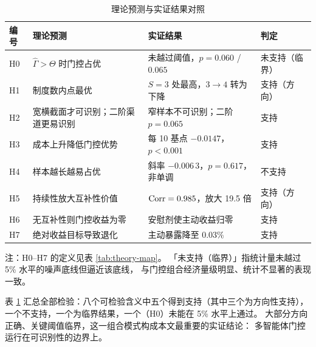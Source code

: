 \begin{table}[htbp]
\centering
\caption{理论预测与实证结果对照}
\label{tab:verdict}
\begin{threeparttable}
\footnotesize
\begin{tabular}{lp{4.2cm}p{4.6cm}l}
\toprule
编号 & 理论预测 & 实证结果 & 判定 \\
\midrule
H0 & $\hat\Gamma>\Theta$ 时门控占优 & 未越过阈值，$p=0.060$ / $0.065$ & 未支持（临界） \\
H1 & 制度数内点最优 & $S=3$ 处最高，$3\to4$ 转为下降 & 支持（方向） \\
H2 & 宽横截面才可识别；二阶渠道更易识别 & 窄样本不可识别；二阶 $p=0.065$ & 支持 \\
H3 & 成本上升降低门控优势 & 每 10 基点 $-0.0147$，$p<0.001$ & 支持 \\
H4 & 样本越长越易占优 & 斜率 $-0.006\,3$，$p=0.617$，非单调 & 不支持 \\
H5 & 持续性放大互补性价值 & $\mathrm{Corr}=0.985$，放大 19.5 倍 & 支持（方向） \\
H6 & 无互补性则门控收益为零 & 安慰剂使主动收益归零 & 支持 \\
H7 & 绝对收益目标导致退化 & 主动暴露降至 $0.03\%$ & 支持 \\
\bottomrule
\end{tabular}
\begin{tablenotes}[flushleft]\footnotesize
\item 注：H0--H7 的定义见表 \ref{tab:theory-map}。
「未支持（临界）」指统计量未越过 5\% 水平的噪声底线但逼近该底线，
与门控组合经济量级明显、统计不显著的表现一致。
\end{tablenotes}
\end{threeparttable}
\end{table}

表 \ref{tab:verdict} 汇总全部检验：八个可检验含义中五个得到支持（其中三个为方向性支持），
一个不支持，一个为临界结果，一个（H0）未能在 5\% 水平上通过。
大部分方向正确、关键阈值临界，这一组合模式构成本文最重要的实证结论：
多智能体门控运行在可识别性的边界上。
